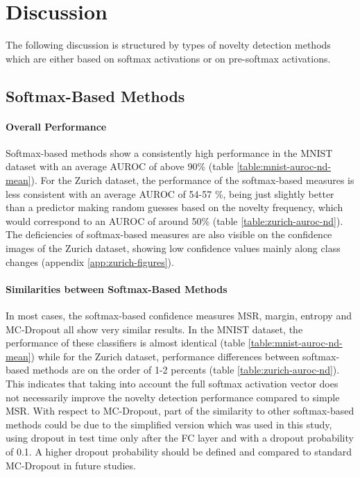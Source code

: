 \documentclass[10pt]{article}
\begin{document}
\section{Discussion}
\label{sec:discussion}
The following discussion is structured by types of novelty detection methods which are either based on softmax activations or on pre-softmax activations.

\subsection{Softmax-Based Methods}
\paragraph{Overall Performance}  Softmax-based methods show a consistently high performance in the \gls{MNIST} dataset with an average \gls{AUROC} of above 90\% (table \ref{table:mnist-auroc-nd-mean}). For the Zurich dataset, the performance of the softmax-based measures is less consistent with an average \gls{AUROC} of 54-57 \%, being just slightly better than a predictor making random guesses based on the novelty frequency, which would correspond to an \gls{AUROC} of around 50\% (table \ref{table:zurich-auroc-nd}). The deficiencies of softmax-based measures are also visible on the confidence images of the Zurich dataset, showing low confidence values mainly along class changes (appendix \ref{app:zurich-figures}).

\paragraph{Similarities between Softmax-Based Methods}  In most cases, the softmax-based confidence measures \gls{MSR}, margin, entropy and \gls{MC-Dropout} all show very similar results. In the MNIST dataset, the performance of these classifiers is almost identical (table \ref{table:mnist-auroc-nd-mean}) while for the Zurich dataset, performance differences between softmax-based methods are on the order of 1-2 percents (table \ref{table:zurich-auroc-nd}). This indicates that taking into account the full softmax activation vector does not necessarily improve the novelty detection performance compared to simple \gls{MSR}. With respect to \gls{MC-Dropout}, part of the similarity to other softmax-based methods could be due to the simplified version which was used in this study, using dropout in test time only after the \gls{FC} layer and with a dropout probability of 0.1. A higher dropout probability should be defined and compared to standard \gls{MC-Dropout} in future studies. 
\end{document}
